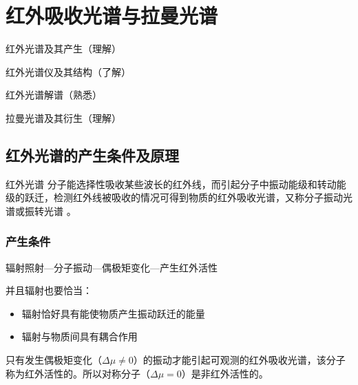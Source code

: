\chapter{红外吸收光谱与拉曼光谱}
\begin{introduction}
	\item 红外光谱及其产生（理解）
	\item 红外光谱仪及其结构（了解）
	\item 红外光谱解谱（熟悉）
	\item 拉曼光谱及其衍生（理解）
\end{introduction}
\section{红外光谱的产生条件及原理}
\begin{definition*}{红外光谱}
	分子能选择性吸收某些波长的红外线，而引起分子中振动能级和转动能级的跃迁，检测红外线被吸收的情况可得到物质的红外吸收光谱，又称分子振动光谱或振转光谱 。
\end{definition*}
\subsection{产生条件}
辐射照射---分子振动---偶极矩变化---产生红外活性

并且辐射也要恰当：
\begin{itemize}
	\item 辐射恰好具有能使物质产生振动跃迁的能量
	\item 辐射与物质间具有耦合作用
\end{itemize}
\begin{note}
	只有发生偶极矩变化（$\Delta \mu \neq 0$）的振动才能引起可观测的红外吸收光谱，该分子称为红外活性的。所以对称分子（$\Delta \mu=0$）是非红外活性的。
\end{note}
